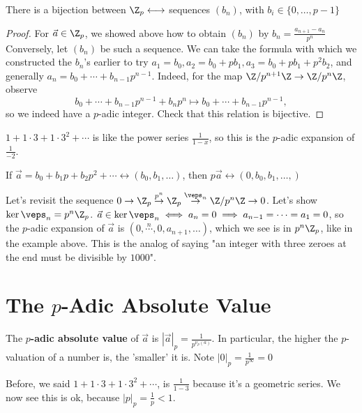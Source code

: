 \begin{thm}
    There is a bijection between $\Z_p \longleftrightarrow $ sequences $(b_n)$, with $b_i \in \{0,\dots,p-1\}$
\end{thm}

\begin{proof}
    For $\vec a \in \Z_p$, we showed above how to obtain $(b_n)$ by $b_n=\frac{a_{n+1}-a_n}{p^n}$ Conversely, let $(b_n)$ be such a sequence. We can take the formula with which we constructed the $b_n$'s earlier to try $a_1=b_0,a_2=b_0+pb_1,a_3=b_0+pb_1+p^2b_2$, and generally $a_n=b_0+\cdots +b_{n-1}p^{n-1}$. Indeed, for the map $\Z/p^{n+1}\Z \to \Z/p^n\Z$, observe
    $$b_0+\cdots+b_{n-1}p^{n-1}+b_np^n \mapsto b_0+\cdots +b_{n-1}p^{n-1},$$
    so we indeed have a $p$-adic integer. Check that this relation is bijective.
\end{proof}

\begin{ex}
    $1+1\cdot 3+1\cdot 3^2+\cdots$ is like the power series $\frac 1{1-x}$, so this  is the $p$-adic expansion of $\frac{1}{-2}$.

    If $\vec a=b_0+b_1p+b_2p^2+\cdots \longleftrightarrow (b_0,b_1,\dots)$, then $p\vec a \longleftrightarrow (0,b_0,b_1,\dots,)$
\end{ex}

Let's revisit the sequence $0 \to \Z_p \overset{p^n}{\to}\Z_p \overset{\veps_n}{\to}\Z/p^n\Z\to 0$. Let's show $\ker \veps _n = p^n\Z_p$. $\vec a \in \ker \veps _n \iff a_n=0 \implies a_{n-1}=\cdots =a_1=0$, so the $p$-adic expansion of $\vec a$ is $(0,\overset{n}{\cdots},0,a_{n+1},\dots)$, which we see is in $p^n\Z_p$, like in the example above. This is the analog of saying "an integer with three zeroes at the end must be divisible by $1000$".

\section{\texorpdfstring{The $p$-Adic Absolute Value}{The p-Adic Absolute Value}}
\begin{defn}
    The \textbf{$p$-adic absolute value} of $\vec a$ is $|\vec a|_p=\frac{1}{p^{\nu_p(a)}}$. In particular, the higher the $p$-valuation of a number is, the 'smaller' it is. Note $|0|_p=\frac{1}{p^\infty}=0$
\end{defn}

\begin{rmk}
    Before, we said $1+1\cdot 3 +1\cdot 3^2+\cdots$, is $\frac{1}{1-3}$ because it's a geometric series. We now see this is ok, because $|p|_p=\frac{1}{p}<1$.
\end{rmk}

